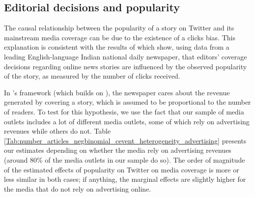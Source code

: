 %
%



\subsection{Editorial decisions and popularity}

The causal relationship between the popularity of a story on Twitter and its mainstream media coverage can be due to the existence of a clicks bias. This explanation is consistent with the results of \citet{SenYildirim2015} which show, using data from a leading English-language Indian national daily newspaper, that editors' coverage decisions regarding online news stories are influenced by the observed popularity of the story, as measured by the number of clicks received.

In \citet{SenYildirim2015}'s framework (which builds on \citet{Latham2015}), the newspaper cares about the revenue generated by covering a story, which is assumed to be proportional to the number of readers. To test for this hypothesis, we use the fact that our sample of media outlets includes a lot of different media outlets, some of which rely on advertising revenues while others do not. Table \ref{Tab:number_articles_negbinomial_cevent_heterogeneity_advertising} presents our estimates depending on whether the media rely on advertising revenues (around 80\% of the media outlets in our sample do so). The order of magnitude of the estimated effects of popularity on Twitter on media coverage is more or less similar in both cases; if anything, the marginal effects are slightly higher for the media that do not rely on advertising online.



